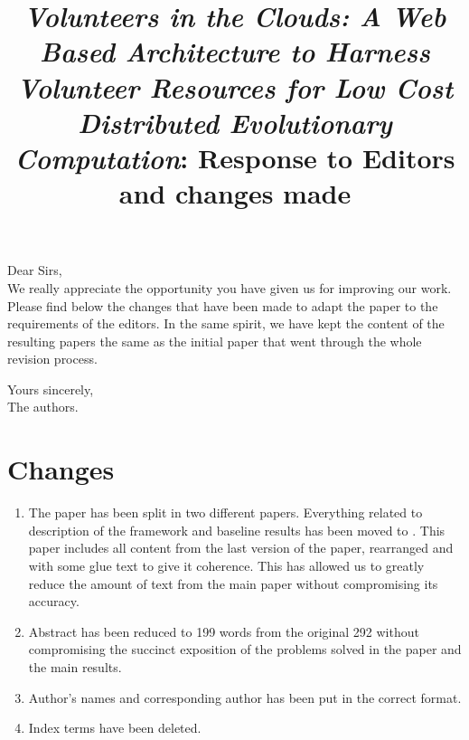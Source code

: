\documentclass[preprint]{elsarticle}
\begin{document}

\title{{\em Volunteers in the Clouds: A Web Based Architecture to Harness Volunteer Resources 
for Low Cost Distributed Evolutionary Computation}: Response to
Editors and changes made}

\noindent
Dear Sirs,\\

We really appreciate the opportunity you have given us for improving
our work. Please find below the changes that have been made to adapt
the paper to the requirements of the editors. In the same spirit, we
have kept the content of the resulting papers the same as the initial
paper that went through the whole revision process. 

\noindent
Yours sincerely,\\
The authors.

\section{Changes}

\begin{enumerate}
\item The paper has been split in two different papers. Everything
  related to description of the framework and baseline results has
  been moved to \cite{2016arXiv160101607M}. This paper includes all
  content from the last version of the paper, rearranged and with some
  glue text to give it coherence. This has allowed us to greatly
  reduce the amount of text from the main paper without compromising
  its accuracy.
\item Abstract has been reduced to 199 words from the original 292
  without compromising the succinct exposition of the problems solved
  in the paper and the main results.
\item Author's names and corresponding author has been put in the
  correct format.
\item Index terms have been deleted. 
\end{enumerate}




\end{document}
